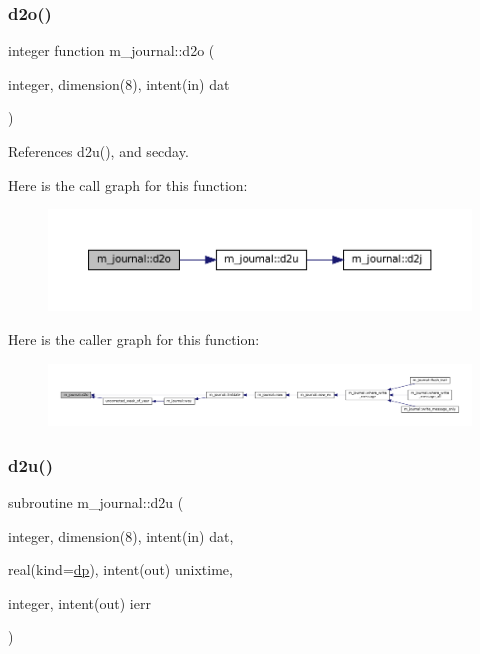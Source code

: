 \subsubsection{\texorpdfstring{d2o()}{d2o()}}
{\footnotesize\ttfamily integer function m\+\_\+journal\+::d2o (\begin{DoxyParamCaption}\item[{integer, dimension(8), intent(in)}]{dat }\end{DoxyParamCaption})\hspace{0.3cm}{\ttfamily [private]}}



References d2u(), and secday.

Here is the call graph for this function\+:\nopagebreak
\begin{figure}[H]
\begin{center}
\leavevmode
\includegraphics[width=350pt]{namespacem__journal_ac12ae324e8c89f7400fb9ef0a581dc00_cgraph}
\end{center}
\end{figure}
Here is the caller graph for this function\+:\nopagebreak
\begin{figure}[H]
\begin{center}
\leavevmode
\includegraphics[width=350pt]{namespacem__journal_ac12ae324e8c89f7400fb9ef0a581dc00_icgraph}
\end{center}
\end{figure}
\mbox{\label{namespacem__journal_a9cd7f892071e8ddfde7e45fea077c3ce}} 
\subsubsection{\texorpdfstring{d2u()}{d2u()}}
{\footnotesize\ttfamily subroutine m\+\_\+journal\+::d2u (\begin{DoxyParamCaption}\item[{integer, dimension(8), intent(in)}]{dat,  }\item[{real(kind=\mbox{\hyperlink{namespacem__journal_aaae0522a70bb76a85ea800670d5fec5f}{dp}}), intent(out)}]{unixtime,  }\item[{integer, intent(out)}]{ierr }\end{DoxyParamCaption})\hspace{0.3cm}{\ttfamily [private]}}



